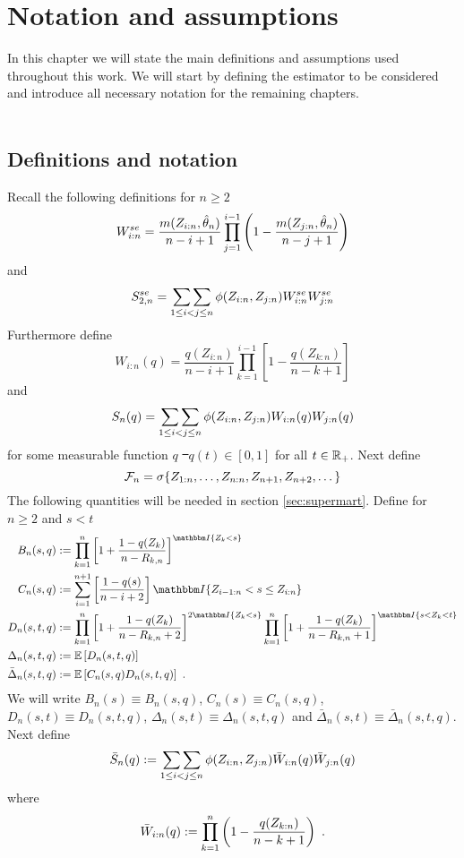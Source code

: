 \chapter{Notation and assumptions} \label{ch:notation}
In this chapter we will state the main definitions and assumptions used throughout this work. We will start by defining the estimator to be considered and introduce all necessary notation for the remaining chapters.\\
\\
\section{Definitions and notation}
Recall the following definitions for $n\geq2$
$$W_{i:n}^{se} = \frac{m(Z_{i:n}, \hat{\theta}_n)}{n-i+1} \prod\limits_{j=1}^{i-1}\left(1-\frac{m(Z_{j:n}, \hat{\theta}_n)}{n-j+1}\right)$$
%
and
$$S_{2,n}^{se} = \mathop{\sum\sum}\limits_{1\leq i<j\leq n}\phi(Z_{i:n}, Z_{j:n})W_{i:n}^{se}W_{j:n}^{se}$$
%
Furthermore define
$$W_{i:n}(q) = \frac{q(Z_{i:n})}{n-i+1}\prod_{k=1}^{i-1}\left[1-\frac{q(Z_{k:n})}{n-k+1}\right]$$
and 
$$S_{n}(q) = \mathop{\sum\sum}\limits_{1\leq i<j\leq n}\phi(Z_{i:n}, Z_{j:n})W_{i:n}(q)W_{j:n}(q)$$
for some measurable function $q$ \st\ $q(t)\in[0,1]$ for all $t\in\mathbb{R}_+$.
%
Next define
$$\mathcal{F}_n = \sigma\{Z_{1:n}, \dots, Z_{n:n}, Z_{n+1}, Z_{n+2}, \dots\}$$
%
The following quantities will be needed in section \ref{sec:supermart}. Define for $n\geq 2$ and $s < t$
\begin{align*}
B_n(s,q) &:= \prod_{k=1}^{n}\left[1+\frac{1-q(Z_{k})}{n-R_{k,n}}\right]^{\I{Z_{k} < s}}\\
C_n(s,q) &:= \sum_{i=1}^{n+1}\left[\frac{1-q(s)}{n-i+2}\right]\I{Z_{i-1:n} < s \leq Z_{i:n}}\\
D_n(s,t,q) &:= \prod_{k=1}^{n} \left[1+\frac{1-q(Z_k)}{n-R_{k,n} +2}\right]^{2\I{Z_k<s}} \prod_{k=1}^{n}\left[1+\frac{1-q(Z_k)}{n-R_ {k,n}+1}\right]^{\I{s < Z_k < t}}\\
\Delta_n(s,t,q) &:= \E\left[D_n(s,t,q) \right]\\
\bar{\Delta}_n(s,t,q) &:= \E\left[C_n(s,q)D_n(s,t,q) \right]\mdot
\end{align*}
We will write $B_n(s) \equiv B_n(s,q)$, $C_n(s) \equiv C_n(s,q)$, $D_n(s,t) \equiv D_n(s,t,q)$, $\Delta_n(s,t) \equiv \Delta_n(s,t,q)$ and $\bar\Delta_n(s,t) \equiv \bar\Delta_n(s,t,q)$. Next define
$$\bar{S}_n(q) := \mathop{\sum\sum}\limits_{1\leq i < j \leq n} \phi(Z_{i:n},Z_{j:n}) \bar{W}_{i:n}(q) \bar{W}_{j:n}(q)$$
where 
$$\bar{W}_{i:n}(q) := \prod_{k=1}^{n}\left(1-\frac{q(Z_{k:n})}{n-k+1}\right)\textrm{ .}$$
